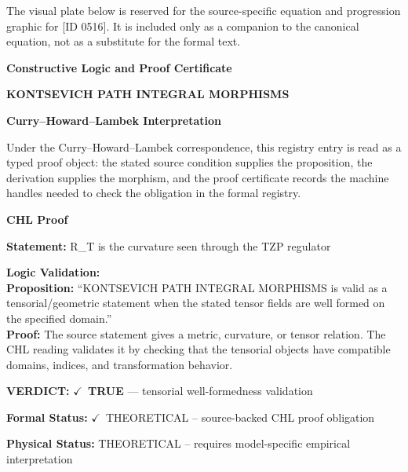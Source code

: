 \begingroup\footnotesize\sloppy
The visual plate below is reserved for the source-specific equation and progression graphic for [ID 0516]. It is included only as a companion to the canonical equation, not as a substitute for the formal text.
\par\endgroup
\ifTZPDarkEdition
{}
\fi

\clearpage
\begingroup\tzpsupportsetup
\noindent\textbf{\fontsize{10.8pt}{12.8pt}\selectfont [ID 0516] Constructive Logic and Proof Certificate}\par
\noindent\textbf{\fontsize{10pt}{12pt}\selectfont KONTSEVICH PATH INTEGRAL MORPHISMS}\par
\vspace{0.45em}
\begingroup
\footnotesize
\setlength{\parskip}{0.22em}
\setlength{\parindent}{0pt}
\noindent\textbf{Curry--Howard--Lambek Interpretation}\par
Under the Curry--Howard--Lambek correspondence, this registry entry is read as a typed proof
object: the stated source condition supplies the proposition, the derivation supplies the
morphism, and the proof certificate records the machine handles needed to check the obligation
in the formal registry.

\vspace{0.45em}
\noindent\textbf{CHL Proof}\par
\textbf{Statement:} R\_T is the curvature seen through the TZP regulator

\textbf{Logic Validation:}\\
\textbf{Proposition:} ``KONTSEVICH PATH INTEGRAL MORPHISMS is valid as a tensorial/geometric statement when the
stated tensor fields are well formed on the specified domain.''\\
\textbf{Proof:} The source statement gives a metric, curvature, or tensor relation. The CHL reading
validates it by checking that the tensorial objects have compatible domains, indices,
and transformation behavior.

\textbf{VERDICT:} \ensuremath{\checkmark}\ \textbf{TRUE} --- tensorial well-formedness validation

\textbf{Formal Status:} \ensuremath{\checkmark}\ THEORETICAL -- source-backed CHL proof obligation

\textbf{Physical Status:} THEORETICAL -- requires model-specific empirical interpretation
\par\vspace{0.45em}
\par
\ifTZPDarkEdition
{}
\fi
\endgroup
\endgroup
